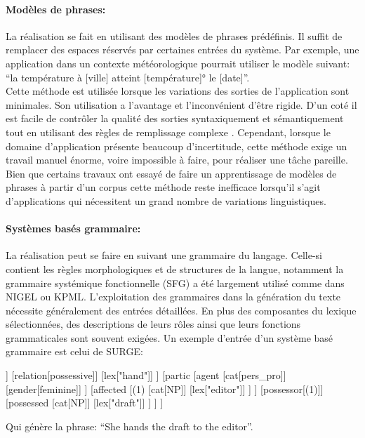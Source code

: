 	\paragraph{Modèles de phrases:} La réalisation se fait en utilisant des modèles de phrases prédéfinis. Il suffit de remplacer des espaces réservés par certaines entrées du système. Par exemple, une application dans un contexte météorologique pourrait utiliser le modèle suivant: “la température à [ville] atteint [température]° le [date]”.\\
Cette méthode est utilisée lorsque les variations des sorties de l’application sont minimales. Son utilisation a l’avantage et l’inconvénient d’être rigide. D’un coté il est facile de contrôler la qualité des sorties syntaxiquement et sémantiquement tout en utilisant des règles de remplissage complexe \cite{Theune2001}. Cependant, lorsque le domaine d’application présente beaucoup d’incertitude, cette méthode exige un travail manuel énorme, voire impossible à faire, pour réaliser une tâche pareille. Bien que certains travaux ont essayé de faire un apprentissage de modèles de phrases à partir d’un corpus\cite{Angeli2012} cette méthode reste inefficace lorsqu’il s’agit d’applications qui nécessitent un grand nombre de variations linguistiques.
	\paragraph{Systèmes basés grammaire:} La réalisation peut se faire en suivant une grammaire du langage. Celle-si contient les règles morphologiques et de structures de la langue, notamment la grammaire systémique fonctionnelle (SFG)\cite{Halliday2004} a été largement utilisé comme dans NIGEL\cite{Mann1983} ou KPML\cite{Bateman1997}. L’exploitation des grammaires dans la génération du texte nécessite généralement des entrées détaillées. En plus des composantes du lexique sélectionnées, des descriptions de leurs rôles ainsi que leurs fonctions grammaticales sont souvent exigées. Un exemple d’entrée d’un système basé grammaire est celui de SURGE\cite{Elhadad1996}:
	\begin{center}
		\begin{forest} [
			[cat:clause]
			[process
			[type[composite]]
			[relation[possessive]]
			[lex[\color{red}"hand"]]
			]
			[partic
			[agent
			[cat[pers\_pro]]
			[gender[feminine]]
			]
			[affected
			[(1)
			[cat[NP]]
			[lex[\color{red}"editor"]]
			]
			]
			[possessor[(1)]]
			[possessed
			[cat[NP]]
			[lex[\color{red}"draft"]]
			]
			]
			]
		\end{forest}
	\end{center}
	Qui génère la phrase: “She hands the draft to the editor”.\newline

